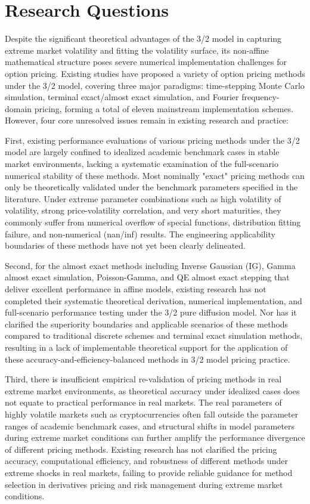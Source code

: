 \section{Research Questions}
Despite the significant theoretical advantages of the 3/2 model in capturing extreme market volatility and fitting the volatility surface, its non-affine mathematical structure poses severe numerical implementation challenges for option pricing. Existing studies have proposed a variety of option pricing methods under the 3/2 model, covering three major paradigms: time-stepping Monte Carlo simulation, terminal exact/almost exact simulation, and Fourier frequency-domain pricing, forming a total of eleven mainstream implementation schemes. However, four core unresolved issues remain in existing research and practice:

First, existing performance evaluations of various pricing methods under the 3/2 model are largely confined to idealized academic benchmark cases in stable market environments, lacking a systematic examination of the full-scenario numerical stability of these methods. Most nominally "exact" pricing methods can only be theoretically validated under the benchmark parameters specified in the literature. Under extreme parameter combinations such as high volatility of volatility, strong price-volatility correlation, and very short maturities, they commonly suffer from numerical overflow of special functions, distribution fitting failure, and non-numerical (nan/inf) results. The engineering applicability boundaries of these methods have not yet been clearly delineated.

Second, for the almost exact methods including Inverse Gaussian (IG), Gamma almost exact simulation, Poisson-Gamma, and QE almost exact stepping that deliver excellent performance in affine models, existing research has not completed their systematic theoretical derivation, numerical implementation, and full-scenario performance testing under the 3/2 pure diffusion model. Nor has it clarified the superiority boundaries and applicable scenarios of these methods compared to traditional discrete schemes and terminal exact simulation methods, resulting in a lack of implementable theoretical support for the application of these accuracy-and-efficiency-balanced methods in 3/2 model pricing practice.

Third, there is insufficient empirical re-validation of pricing methods in real extreme market environments, as theoretical accuracy under idealized cases does not equate to practical performance in real markets. The real parameters of highly volatile markets such as cryptocurrencies often fall outside the parameter ranges of academic benchmark cases, and structural shifts in model parameters during extreme market conditions can further amplify the performance divergence of different pricing methods. Existing research has not clarified the pricing accuracy, computational efficiency, and robustness of different methods under extreme shocks in real markets, failing to provide reliable guidance for method selection in derivatives pricing and risk management during extreme market conditions.

